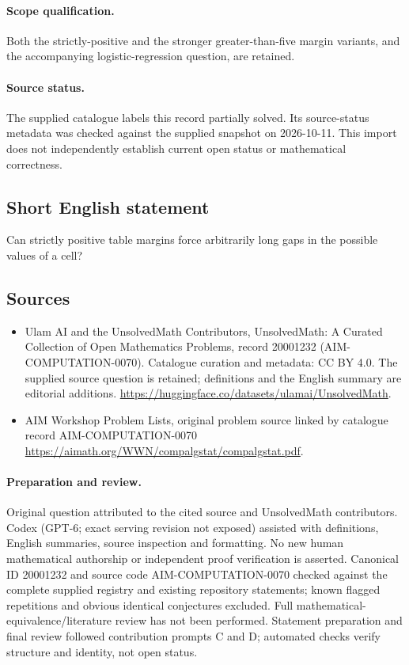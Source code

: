 \documentclass[11pt]{article}
\begin{document}
\paragraph{Scope qualification.}
Both the strictly-positive and the stronger greater-than-five margin variants, and the accompanying logistic-regression question, are retained.
\paragraph{Source status.}
The supplied catalogue labels this record partially solved. Its source-status metadata was checked against the supplied snapshot on 2026-10-11. This import does not independently establish current open status or mathematical correctness.
\subsection{Short English statement}
Can strictly positive table margins force arbitrarily long gaps in the possible values of a cell?
\subsection{Sources}
\begin{itemize}
\item[S1] Ulam AI and the UnsolvedMath Contributors, UnsolvedMath: A Curated Collection of Open Mathematics Problems, record 20001232 (AIM-COMPUTATION-0070). Catalogue curation and metadata: CC BY 4.0. The supplied source question is retained; definitions and the English summary are editorial additions.
\url{https://huggingface.co/datasets/ulamai/UnsolvedMath}.
\item[S2] AIM Workshop Problem Lists, original problem source linked by catalogue record AIM-COMPUTATION-0070
\url{https://aimath.org/WWN/compalgstat/compalgstat.pdf}.
\end{itemize}
\paragraph{Preparation and review.}
Original question attributed to the cited source and UnsolvedMath contributors. Codex (GPT-6; exact serving revision not exposed) assisted with definitions, English summaries, source inspection and formatting. No new human mathematical authorship or independent proof verification is asserted. Canonical ID 20001232 and source code AIM-COMPUTATION-0070 checked against the complete supplied registry and existing repository statements; known flagged repetitions and obvious identical conjectures excluded. Full mathematical-equivalence/literature review has not been performed. Statement preparation and final review followed contribution prompts C and D; automated checks verify structure and identity, not open status.
\label{end:20001232}
\end{document}
